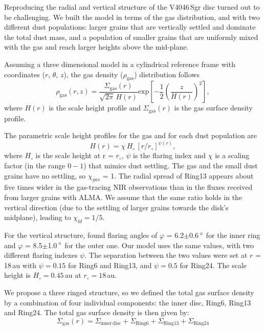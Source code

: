 \documentclass[letters,usenatbib,times]{mnras}
\begin{document}
Reproducing the radial and vertical structure of the V4046\,Sgr disc turned out to be challenging. We built the model in terms of the gas distribution, and with two different dust populations: larger grains that are vertically settled and dominate the total dust mass, and a population of smaller grains that are uniformly mixed with the gas and reach larger heights above the mid-plane. 

Assuming a three dimensional model in a cylindrical reference frame with coordinates ($r$, $\theta$, $z$), the gas density ($\rho_{\mathrm{gas}}$) distribution follows
\begin{equation}
  \rho_{\mathrm{gas}}(r,z) =\frac{\Sigma_{\mathrm{gas}}(r)}{\sqrt{2\pi} \, H(r)} \mathrm{exp}\left[-\frac{1}{2} \left(\frac{z}{H(r)}\right)^2\right],
\end{equation}
where $H(r)$ is the scale height profile and $\Sigma_{\mathrm{gas}}(r)$ is the gas surface density profile. 

The parametric scale height profiles for the gas and for each dust population are 
\begin{equation}
    \label{scale}
  H(r)=\chi \, H_{\circ} \, [r/r_{\circ}]^{\psi(r)},
\end{equation}
where $H_\circ$ is the scale height at r = $r_\circ$, $\psi$ is the flaring index and $\chi$ is a scaling factor (in the range $0-1$) that mimics dust settling. The gas and the small dust grains have no settling, so $\chi_{gas}$ = 1. The radial spread of Ring13 appears about five times wider in the gas-tracing NIR observations than in the fluxes received from larger grains with ALMA. We assume that the same ratio holds in the vertical direction (due to the settling of larger grains towards the disk's midplane), leading to $\chi_{ld}=1/5$.

For the vertical structure, \citet{dOrazi} found flaring angles of $\varphi$ = 6.2$\pm$0.6\,$\hbox{$^\circ$}$ for the inner ring and $\varphi$ = 8.5$\pm$1.0\,$\hbox{$^\circ$}$ for the outer one. Our model uses the same values, with two different flaring indexes $\psi$. The separation between the two values were set at $r$ = 18\,au with $\psi=0.15$ for Ring6 and Ring13, and $\psi=0.5$ for Ring24. The scale height is $H_\circ = 0.45$\,au at $r_\circ = 18$\,au.

We propose a three ringed structure, so we defined the total gas surface density by a combination of four individual components: the inner disc, Ring6, Ring13 and Ring24. The total gas surface density is then  given  by:
\begin{equation}
  \Sigma_{\mathrm{gas}}(r) = \Sigma_{\mathrm{inner\,disc}} + \Sigma_{\mathrm{Ring6}} + \Sigma_{\mathrm{Ring13}} + \Sigma_{\mathrm{Ring24}}
\end{equation}
\end{document}
